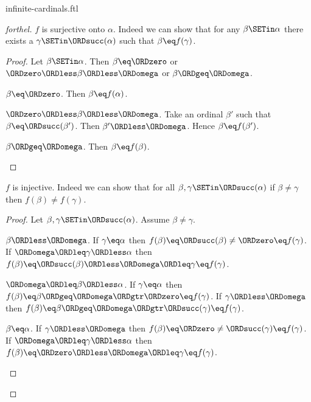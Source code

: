 \documentclass{naproche-library}
\begin{document}
\begin{smodule}[title=Infinite Cardinal Numbers]{infinite-cardinals.ftl}
\begin{proof}[forthel]
  $f$ is surjective onto $\alpha$.
  Indeed we can show that for any $\beta \SETin \alpha$ there exists a
  $\gamma \SETin \ORDsucc(\alpha)$ such that $\beta \eq f(\gamma)$.
  \begin{proof}
    Let $\beta \SETin \alpha$.
    Then $\beta \eq \ORDzero$ or $\ORDzero \ORDless \beta \ORDless \ORDomega$ or $\beta \ORDgeq \ORDomega$.

    \begin{case}{$\beta \eq \ORDzero$.}
      Then $\beta \eq f(\alpha)$.
    \end{case}

    \begin{case}{$\ORDzero \ORDless \beta \ORDless \ORDomega$.}
      Take an ordinal $\beta'$ such that $\beta \eq \ORDsucc(\beta')$.
      Then $\beta' \ORDless \ORDomega$.
      Hence $\beta \eq f(\beta')$.
    \end{case}

    \begin{case}{$\beta \ORDgeq \ORDomega$.}
      Then $\beta \eq f(\beta)$.
    \end{case}
  \end{proof}

  $f$ is injective.
  Indeed we can show that for all $\beta, \gamma \SETin \ORDsucc(\alpha)$ if
  $\beta \neq \gamma$ then $f(\beta) \neq f(\gamma)$.
  \begin{proof}
    Let $\beta, \gamma \SETin \ORDsucc(\alpha)$.
    Assume $\beta \neq \gamma$.

    \begin{case}{$\beta \ORDless \ORDomega$.}
      If $\gamma \eq \alpha$ then
      $f(\beta)
        \eq \ORDsucc(\beta)
        \neq \ORDzero
        \eq f(\gamma)$.
      If $\ORDomega \ORDleq \gamma \ORDless \alpha$ then
      $f(\beta)
        \eq \ORDsucc(\beta)
        \ORDless \ORDomega
        \ORDleq \gamma
        \eq f(\gamma)$.
    \end{case}

    \begin{case}{$\ORDomega \ORDleq \beta \ORDless \alpha$.}
      If $\gamma \eq \alpha$ then
      $f(\beta)
        \eq \beta
        \ORDgeq \ORDomega
        \ORDgtr \ORDzero
        \eq f(\gamma)$.
      If $\gamma \ORDless \ORDomega$ then
      $f(\beta)
        \eq \beta
        \ORDgeq \ORDomega
        \ORDgtr \ORDsucc(\gamma)
        \eq f(\gamma)$.
    \end{case}

    \begin{case}{$\beta \eq \alpha$.}
      If $\gamma \ORDless \ORDomega$ then
      $f(\beta)
        \eq \ORDzero
        \neq \ORDsucc(\gamma)
        \eq f(\gamma)$.
      If $\ORDomega \ORDleq \gamma \ORDless \alpha$ then
      $f(\beta)
        \eq \ORDzero
        \ORDless \ORDomega
        \ORDleq \gamma
        \eq f(\gamma)$.
    \end{case}
  \end{proof}


\end{proof}
\end{smodule}
\end{document}
